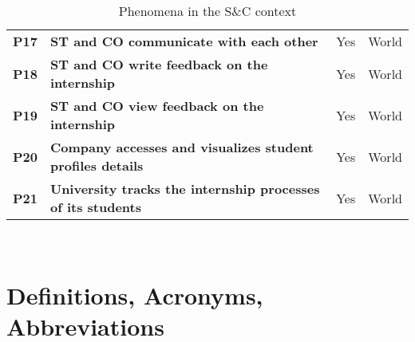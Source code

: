 \begin{table}[H]
\begin{tabular}{|c|p{24em}|c|c|}
    \small\textbf{P17} &\small \textbf{ST and CO communicate with each other} & Yes & World \T\B\\
    \small\textbf{P18} &\small \textbf{ST and CO write feedback on the internship} & Yes & World \T\B\\
    \small\textbf{P19} &\small \textbf{ST and CO view feedback on the internship} & Yes & World \B\\
    \small\textbf{P20} &\small \textbf{Company accesses and visualizes student profiles details} & Yes & World \T\B\\
    \small\textbf{P21} &\small \textbf{University tracks the internship processes of its students} & Yes & World \T\B\\
    \hline
    \end{tabular}
    \\[10pt]
    \caption{Phenomena in the S\&C context}\label{table:phenomena}
\end{table}

\section{Definitions, Acronyms, Abbreviations}\label{sec:definitions}
